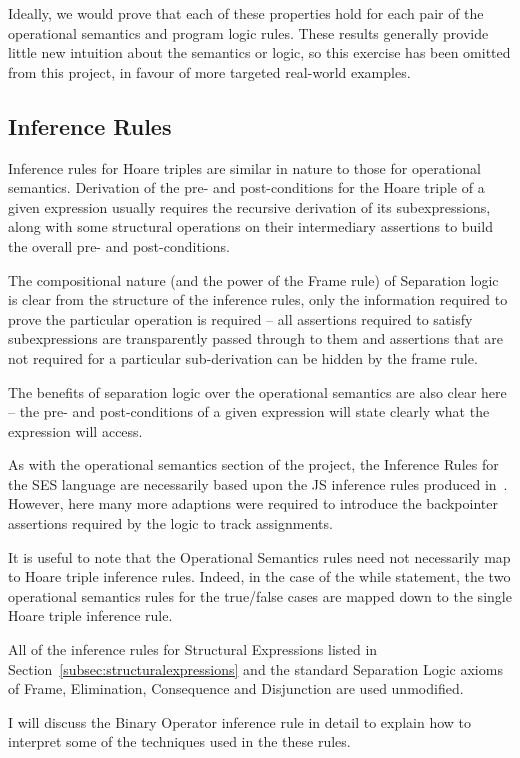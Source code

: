 \documentclass[a4paper,notitlepage]{report}
\begin{document}
Ideally, we would prove that each of these properties hold for each pair of the
operational semantics and program logic rules.
These results generally provide little new intuition about the
semantics or logic, so this exercise has been omitted from this project, in
favour of more targeted real-world examples.

\subsection{Inference Rules}
\label{sec:infrules}
Inference rules for Hoare triples are similar in nature to those for operational
semantics. Derivation of the pre- and post-conditions for the Hoare triple of a
given expression usually requires the recursive derivation of its
subexpressions, along with some structural operations on their intermediary
assertions to build the overall pre- and post-conditions.

The compositional nature (and the power of the Frame rule) of Separation
logic is clear from the structure
of the inference rules, only the information required to prove the particular
operation is required -- all assertions required to satisfy subexpressions are
transparently passed through to them and assertions that are not required for a
particular sub-derivation can be hidden by the frame rule.

The benefits of separation logic over the operational semantics are also clear
here -- the pre- and post-conditions of a given expression will state clearly
what the expression will access.

As with the operational semantics section of the project, the Inference Rules
for the SES language are necessarily based upon the JS inference rules produced
in~\cite{gms-popl}. However, here many more adaptions were required to
introduce the backpointer assertions required by the logic to track assignments.

It is useful to note that the Operational Semantics rules need not necessarily
map to Hoare triple inference rules. Indeed, in the case of the while statement,
the two operational semantics rules for the true/false cases are mapped down to
the single Hoare triple inference rule.

All of the inference rules for Structural Expressions listed in
Section~\ref{subsec:structuralexpressions} and the standard Separation Logic
axioms of Frame, Elimination, Consequence and Disjunction are used unmodified.

I will discuss the Binary Operator inference rule in detail to explain how to
interpret some of the techniques used in the these rules.
\end{document}
